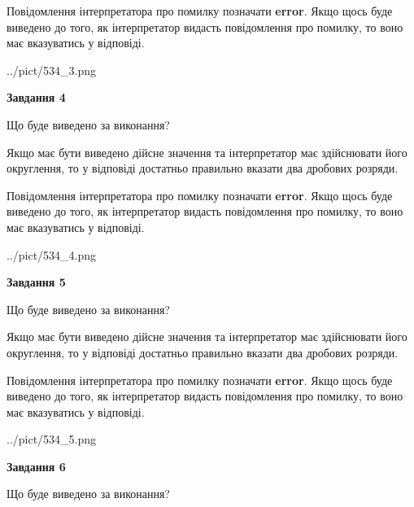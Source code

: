 \documentclass[12pt, ukrainian]{article}
\begin{document}
{\begin {Large}
Повідомлення інтерпретатора про помилку позначати \textbf{error}.
Якщо щось буде виведено до того, як інтерпретатор видасть повідомлення про помилку, 
то воно має вказуватись у відповіді. \par

\begin{center}
	{../pict/534_3.png}
\end{center}
\newpage

{\begin {center}\textbf{Завдання 4}\end {center}}\par
Що буде виведено за виконання? \par

Якщо має бути виведено дійсне значення та інтерпретатор має здійснювати його округлення, 
то у відповіді достатньо правильно вказати два дробових розряди.

Повідомлення інтерпретатора про помилку позначати \textbf{error}.
Якщо щось буде виведено до того, як інтерпретатор видасть повідомлення про помилку, 
то воно має вказуватись у відповіді. \par

\begin{center}
	{../pict/534_4.png}
\end{center}
\newpage

{\begin {center}\textbf{Завдання 5}\end {center}}\par
Що буде виведено за виконання? \par

Якщо має бути виведено дійсне значення та інтерпретатор має здійснювати його округлення, 
то у відповіді достатньо правильно вказати два дробових розряди.

Повідомлення інтерпретатора про помилку позначати \textbf{error}.
Якщо щось буде виведено до того, як інтерпретатор видасть повідомлення про помилку, 
то воно має вказуватись у відповіді. \par

\begin{center}
	{../pict/534_5.png}
\end{center}
\newpage

{\begin {center}\textbf{Завдання 6}\end {center}}\par
Що буде виведено за виконання? \par


\end{Large}}
\end{document}
